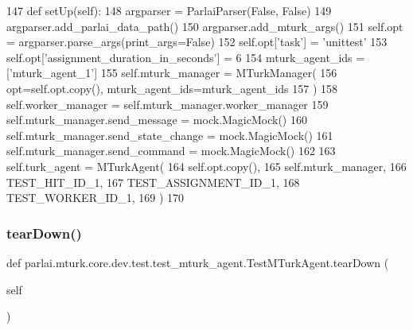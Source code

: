 \begin{DoxyCode}
147     \textcolor{keyword}{def }setUp(self):
148         argparser = ParlaiParser(\textcolor{keyword}{False}, \textcolor{keyword}{False})
149         argparser.add\_parlai\_data\_path()
150         argparser.add\_mturk\_args()
151         self.opt = argparser.parse\_args(print\_args=\textcolor{keyword}{False})
152         self.opt[\textcolor{stringliteral}{'task'}] = \textcolor{stringliteral}{'unittest'}
153         self.opt[\textcolor{stringliteral}{'assignment\_duration\_in\_seconds'}] = 6
154         mturk\_agent\_ids = [\textcolor{stringliteral}{'mturk\_agent\_1'}]
155         self.mturk\_manager = MTurkManager(
156             opt=self.opt.copy(), mturk\_agent\_ids=mturk\_agent\_ids
157         )
158         self.worker\_manager = self.mturk\_manager.worker\_manager
159         self.mturk\_manager.send\_message = mock.MagicMock()
160         self.mturk\_manager.send\_state\_change = mock.MagicMock()
161         self.mturk\_manager.send\_command = mock.MagicMock()
162 
163         self.turk\_agent = MTurkAgent(
164             self.opt.copy(),
165             self.mturk\_manager,
166             TEST\_HIT\_ID\_1,
167             TEST\_ASSIGNMENT\_ID\_1,
168             TEST\_WORKER\_ID\_1,
169         )
170 
\end{DoxyCode}
\mbox{\label{classparlai_1_1mturk_1_1core_1_1dev_1_1test_1_1test__mturk__agent_1_1TestMTurkAgent_ae8fbec62c492cb5ce4338ebff8dff264}} 
\subsubsection{\texorpdfstring{tear\+Down()}{tearDown()}}
{\footnotesize\ttfamily def parlai.\+mturk.\+core.\+dev.\+test.\+test\+\_\+mturk\+\_\+agent.\+Test\+M\+Turk\+Agent.\+tear\+Down (\begin{DoxyParamCaption}\item[{}]{self }\end{DoxyParamCaption})}



